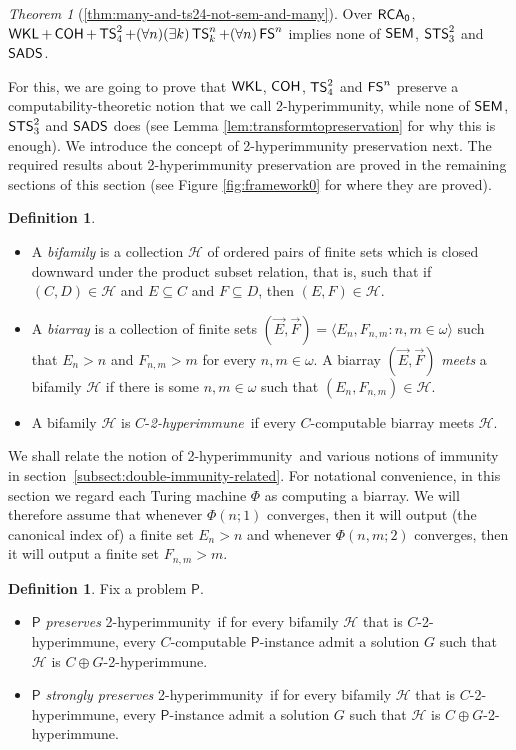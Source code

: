 \documentclass{amsart}
\theoremstyle{definition}
\newtheorem{definition}[theorem]{Definition}
\theoremstyle{remark}
\numberwithin{equation}{section}
\theoremstyle{noparens}
\newtheorem*{theorem*}{Theorem}
\def\propertyL{2-hyperimmunity}
\def\hyper{2-hyperimmune}
\def\msf{\mathsf}
\newcommand{\Psf}{\mathsf{P}}
\newcommand{\Hcal}{\mathcal{H}}
\newcommand{\s}[1]{\ensuremath{\sf{#1}}}
\DeclareMathOperator{\rca}{\s{RCA}_0}
\DeclareMathOperator{\wkl}{\s{WKL}}
\DeclareMathOperator{\sads}{\s{SADS}}
\DeclareMathOperator{\coh}{\s{COH}}
\DeclareMathOperator{\ts}{\s{TS}}
\DeclareMathOperator{\sts}{\s{STS}}
\DeclareMathOperator{\fs}{\s{FS}}
\DeclareMathOperator{\semo}{\s{SEM}}
\begin{document}
\begin{theorem*}[\ref{thm:many-and-ts24-not-sem-and-many}]
Over $\rca$, $\wkl + \coh + \ts^2_4 + (\forall n)(\exists k)\ts^n_k + (\forall n)\fs^n$
implies none of $\semo$, $\sts^2_3$ and $\sads$.
\end{theorem*}

For this, we are going to prove that $\wkl$, $\coh$, $\ts^2_4$ and $\fs^n$
preserve a computability-theoretic notion that we call \propertyL,
while none of $\semo$, $\sts^2_3$ and $\sads$ does (see Lemma \ref{lem:transformtopreservation}
for why this is enough).
We introduce the
concept of 2-hyperimmunity preservation next.  The required results about
2-hyperimmunity preservation are proved in the remaining sections of this section
(see Figure \ref{fig:framework0} for where they are proved).
\begin{definition}\
\begin{itemize}
	\item[(1)] A \emph{bifamily} is a collection $\Hcal$
of ordered pairs of finite  sets which is closed downward under the product subset relation,
that is, such that if $(C, D) \in \Hcal$ and $E \subseteq C$ and $F \subseteq D$,
then $(E, F) \in \Hcal$.

	\item[(2)] A \emph{biarray} is a collection of finite  sets
$(\vec{E},\vec{F}) = \langle E_n, F_{n,m} : n, m \in \omega \rangle$ such that
$E_n >n$ and $F_{n,m} > m$ for every $n, m \in \omega$.
A biarray $(\vec{E},\vec{F})$ \emph{meets} a bifamily $\Hcal$ if there
is some $n, m \in \omega$ such that $(E_n, F_{n,m}) \in \Hcal$.

	\item[(3)] A bifamily $\Hcal$ is $C$-\emph{\hyper}\
if every $C$-computable biarray meets $\Hcal$.
\end{itemize}
\end{definition}

We shall relate the notion of \propertyL\ and various notions
of immunity in section~\ref{subsect:double-immunity-related}.
For notational convenience,
in this section we regard each Turing machine $\Phi$ as computing
a biarray. We will therefore assume that whenever $\Phi(n;1)$ converges,
then it will output (the canonical index of) a finite  set $E_n > n$ and
 whenever $\Phi(n,m;2)$
converges, then it will output a finite  set $F_{n,m} > m$.

\begin{definition}Fix a problem $\Psf$.
\begin{itemize}
	\item[(1)] $\msf{P}$ \emph{preserves} \propertyL\ if
for every  bifamily $\Hcal$ that is $C$-\hyper,
every $C$-computable $\msf{P}$-instance
admit a solution $G$ such that
$\Hcal$ is $C\oplus G$-\hyper.

	\item[(2)] $\msf{P}$ \emph{strongly preserves} \propertyL\ if
for every bifamily $\Hcal$ that is $C$-\hyper,
every $\msf{P}$-instance
admit a solution $G$ such that
$\Hcal$ is $C\oplus G$-\hyper.
\end{itemize}
\end{definition}
\end{document}
